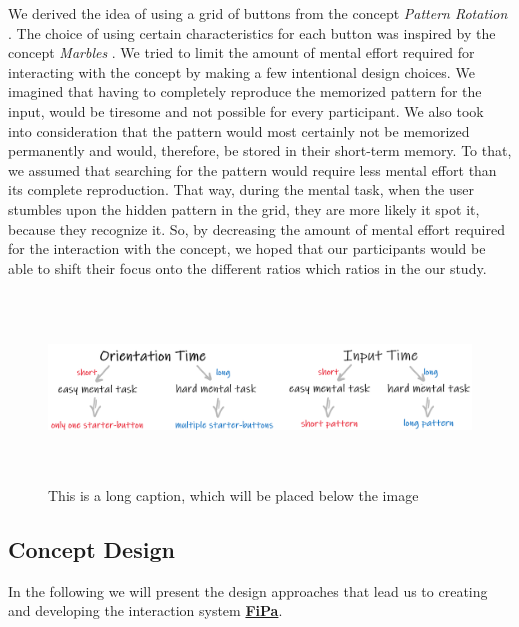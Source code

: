 We derived the idea of using a grid of buttons from the concept \textit{Pattern Rotation} \cite{patternRotation, anonymous}. The choice of using certain characteristics for each button was inspired by the concept \textit{Marbles} \cite{patternRotation, anonymous}. We tried to limit the amount of mental effort required for interacting with the concept by making a few intentional design choices. We imagined that having to completely reproduce the memorized pattern for the input, would be tiresome and not possible for every participant. We also took into consideration that the pattern would most certainly not be memorized permanently and would, therefore, be stored in their short-term memory. To that, we assumed that searching for the pattern would require less mental effort than its complete reproduction. That way, during the mental task, when the user stumbles upon the hidden pattern in the grid, they are more likely it spot it, because they recognize it. So, by decreasing the amount of mental effort required for the interaction with the concept, we hoped that our participants would be able to shift their focus onto the different ratios which ratios in the our study.

\begin{figure}[t!]
\centering
\includegraphics[width=15cm, height=5cm]{Chapters/graphics/OriInput.PNG}
\caption[This is a short caption for the index]{This is a long caption, which will be placed below the image}
\label{fig:orientation_input}
\end{figure}


\subsection{Concept Design} \label{4.2.2}
In the following we will present the design approaches that lead us to creating and developing the interaction system \underline{\textbf{FiPa}}.

